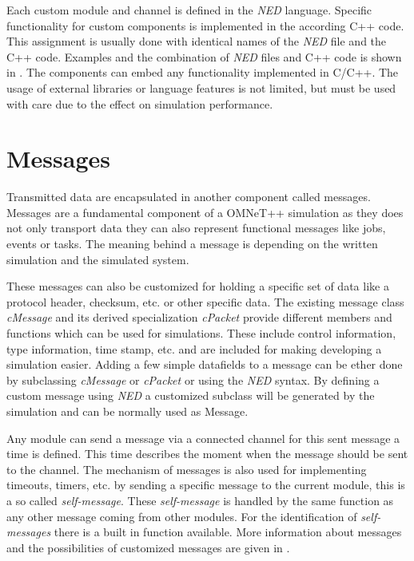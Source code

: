 Each custom module and channel is defined in the \emph{NED} language.
Specific functionality for custom components is implemented in the according C++ code.
This assignment is usually done with identical names of the \emph{NED} file and the C++ code.
Examples and the combination of \emph{NED} files and C++ code is shown in \cite[chapter 3, chapter 4]{omnet_manual}.
The components can embed any functionality implemented in C/C++.
The usage of external libraries or language features is not limited, but must be used with care due to the effect on simulation performance.


\section{Messages}
Transmitted data are encapsulated in another component called messages.
Messages are a fundamental component of a OMNeT++ simulation as they does not only transport data they can also represent functional messages like jobs, events or tasks.
The meaning behind a message is depending on the written simulation and the simulated system.

These messages can also be customized for holding a specific set of data like a protocol header, checksum, etc. or other specific data.
The existing message class \emph{cMessage} and its derived specialization \emph{cPacket} provide different members and functions which can be used for simulations.
These include control information, type information, time stamp, etc. and are included for making developing a simulation easier.
Adding a few simple datafields to a message can be ether done by subclassing \emph{cMessage} or \emph{cPacket} or using the \emph{NED} syntax.
By defining a custom message using \emph{NED} a customized subclass will be generated by the simulation and can be normally used as Message.

Any module can send a message via a connected channel for this sent message a time is defined.
This time describes the moment when the message should be sent to the channel.
The mechanism of messages is also used for implementing timeouts, timers, etc. by sending a specific message to the current module, this is a so called \emph{self-message}.
These \emph{self-message} is handled by the same function as any other message coming from other modules.
For the identification of \emph{self-messages} there is a built in function available.
More information about messages and the possibilities of customized messages are given in \cite[chapter 5]{omnet_manual}.

